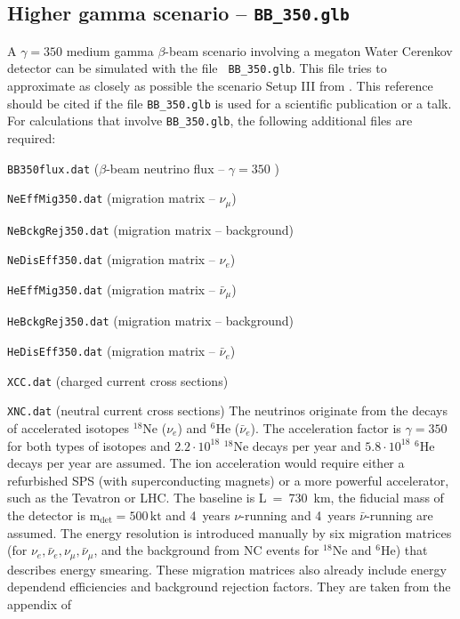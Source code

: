 \subsection*{Higher gamma scenario -- {\tt BB\_350.glb}}

A $\gamma=350$ medium gamma $\beta$-beam scenario involving a megaton Water Cerenkov detector can be simulated with the file {\tt
BB\_350.glb}. This file tries to approximate as closely as possible the scenario {\sf Setup III} from
\cite{Burguet-Castell:2005pa}. This reference
should be cited if the file {\tt BB\_350.glb} is used for a scientific publication or a talk. For calculations that
involve {\tt BB\_350.glb}, the following additional files are required: 
\bi
\item {\tt BB350flux.dat} ($\beta$-beam neutrino flux -- $\gamma=350$ )
\item {\tt NeEffMig350.dat} (migration matrix -- $\nu_\mu$)
\item {\tt NeBckgRej350.dat} (migration matrix -- background)
\item {\tt NeDisEff350.dat} (migration matrix -- $\nu_e$)
\item {\tt HeEffMig350.dat} (migration matrix -- $\bar{\nu}_\mu$)
\item {\tt HeBckgRej350.dat} (migration matrix -- background)
\item {\tt HeDisEff350.dat} (migration matrix -- $\bar{\nu}_e$)
\item {\tt XCC.dat} (charged current cross sections)
\item {\tt XNC.dat} (neutral current cross sections)
\ei
The neutrinos originate from the decays of accelerated isotopes $^{18}$Ne ($\nu_e$) and $^6$He ($\bar{\nu}_e$).
The acceleration factor is $\gamma=350$ for both types of isotopes and $2.2\cdot10^{18}$ $^{18}$Ne decays per
year and $5.8\cdot10^{18}$ $^{6}$He decays per year are assumed. The ion acceleration would require either a refurbished SPS (with
superconducting magnets) or a more powerful accelerator, such as the
Tevatron or LHC. The baseline is L~=~730~km, the
fiducial mass of the detector is $\mathrm{m_{det} = 500 \,kt}$ and 4~years $\nu$-running and 4~years
$\bar{\nu}$-running are assumed. The energy resolution is introduced manually by
six migration matrices (for $\nu_e , \bar{\nu}_e ,\nu_{\mu} ,\bar{\nu}_\mu$, and the background from NC events
for $^{18}$Ne and $^6$He) that describes energy smearing. These migration matrices also already include energy
dependend efficiencies and background rejection factors. They are taken from the appendix of
